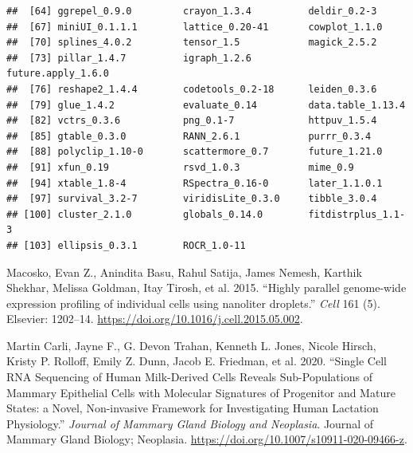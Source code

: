 \documentclass[]{article}
\begin{document}
\begin{verbatim}
##  [64] ggrepel_0.9.0         crayon_1.3.4          deldir_0.2-3         
##  [67] miniUI_0.1.1.1        lattice_0.20-41       cowplot_1.1.0        
##  [70] splines_4.0.2         tensor_1.5            magick_2.5.2         
##  [73] pillar_1.4.7          igraph_1.2.6          future.apply_1.6.0   
##  [76] reshape2_1.4.4        codetools_0.2-18      leiden_0.3.6         
##  [79] glue_1.4.2            evaluate_0.14         data.table_1.13.4    
##  [82] vctrs_0.3.6           png_0.1-7             httpuv_1.5.4         
##  [85] gtable_0.3.0          RANN_2.6.1            purrr_0.3.4          
##  [88] polyclip_1.10-0       scattermore_0.7       future_1.21.0        
##  [91] xfun_0.19             rsvd_1.0.3            mime_0.9             
##  [94] xtable_1.8-4          RSpectra_0.16-0       later_1.1.0.1        
##  [97] survival_3.2-7        viridisLite_0.3.0     tibble_3.0.4         
## [100] cluster_2.1.0         globals_0.14.0        fitdistrplus_1.1-3   
## [103] ellipsis_0.3.1        ROCR_1.0-11
\end{verbatim}

\hypertarget{refs}{}
\leavevmode\hypertarget{ref-Macosko2015}{}%
Macosko, Evan Z., Anindita Basu, Rahul Satija, James Nemesh, Karthik
Shekhar, Melissa Goldman, Itay Tirosh, et al. 2015. ``Highly parallel
genome-wide expression profiling of individual cells using nanoliter
droplets.'' \emph{Cell} 161 (5). Elsevier: 1202--14.
\url{https://doi.org/10.1016/j.cell.2015.05.002}.

\leavevmode\hypertarget{ref-MartinCarli2020}{}%
Martin Carli, Jayne F., G. Devon Trahan, Kenneth L. Jones, Nicole
Hirsch, Kristy P. Rolloff, Emily Z. Dunn, Jacob E. Friedman, et al.
2020. ``Single Cell RNA Sequencing of Human Milk-Derived Cells Reveals
Sub-Populations of Mammary Epithelial Cells with Molecular Signatures of
Progenitor and Mature States: a Novel, Non-invasive Framework for
Investigating Human Lactation Physiology.'' \emph{Journal of Mammary
Gland Biology and Neoplasia}. Journal of Mammary Gland Biology;
Neoplasia. \url{https://doi.org/10.1007/s10911-020-09466-z}.
\end{document}
